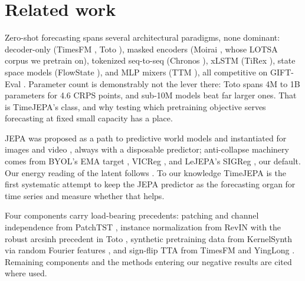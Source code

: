 \section{Related work}
\label{sec:related}

Zero-shot forecasting spans several architectural paradigms, none
dominant: decoder-only (TimesFM \citep{das2024timesfm}, Toto
\citep{cohen2024toto}), masked encoders (Moirai \citep{woo2024moirai},
whose LOTSA corpus we pretrain on), tokenized seq-to-seq (Chronos
\citep{ansari2024chronos}), xLSTM (TiRex \citep{auer2025tirex}), state
space models (FlowState \citep{flowstate2025}), and MLP mixers (TTM
\citep{ekambaram2024ttm}), all competitive on GIFT-Eval
\citep{aksu2024gifteval}. Parameter count is demonstrably not the lever
there: Toto spans 4M to 1B parameters for 4.6 CRPS points, and sub-10M
models beat far larger ones. That is TimeJEPA's class, and why testing
which pretraining objective serves forecasting at fixed small capacity has
a place.

JEPA was proposed as a path to predictive world models
\citep{lecun2022path} and instantiated for images and video
\citep{assran2023ijepa,bardes2024vjepa,assran2025vjepa2}, always with a
disposable predictor; anti-collapse machinery comes from BYOL's EMA
target \citep{grill2020byol,chen2021mocov3}, VICReg
\citep{bardes2022vicreg}, and LeJEPA's SIGReg
\citep{balestriero2025lejepa}, our default. Our energy reading of the
latent follows \citet{lecun2006ebm}. To our knowledge TimeJEPA is the
first systematic attempt to keep the JEPA predictor as the forecasting
organ for time series and measure whether that helps.

Four components carry load-bearing precedents: patching and channel
independence from PatchTST \citep{nie2023patchtst}, instance
normalization from RevIN \citep{kim2022revin} with the robust arcsinh
precedent in Toto \citep{cohen2024toto}, synthetic pretraining data from
KernelSynth \citep{ansari2024chronos} via random Fourier features
\citep{rahimi2007rff}, and sign-flip TTA from TimesFM and YingLong
\citep{das2024timesfm,yinglong2025}. Remaining components and the
methods entering our negative results are cited where used.
